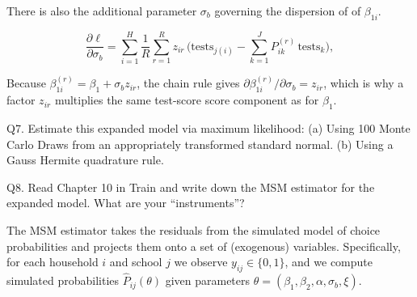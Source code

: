 \documentclass{article}
\begin{document}
There is also the additional parameter $\sigma_b$ governing the dispersion of of $\beta_{1i}$.

\[
\frac{\partial \ell}{\partial \sigma_b}
=\sum_{i=1}^H \frac{1}{R}\sum_{r=1}^R 
z_{ir}\,\Big( \text{tests}_{j(i)} - \sum_{k=1}^J P_{ik}^{(r)}\,\text{tests}_k \Big),
\]

Because $\beta_{1i}^{(r)} = \beta_1 + \sigma_b z_{ir}$, the chain rule gives 
$\partial \beta_{1i}^{(r)} / \partial \sigma_b = z_{ir}$, which is why a factor $z_{ir}$ multiplies the same test-score score component as for $\beta_1$.



\begin{tcolorbox}
Q7. Estimate this expanded model via maximum likelihood: (a) Using 100 Monte Carlo Draws from an appropriately transformed standard normal. (b) Using a Gauss Hermite quadrature rule.
\end{tcolorbox}

\begin{table}[H]
\centering
{}
\caption{Estimation results for logit models.}
\end{table}


\begin{tcolorbox}
Q8. Read Chapter 10 in Train and write down the MSM estimator for the expanded model. What are your ``instruments''?
\end{tcolorbox}

The MSM estimator takes the residuals from the simulated model of choice probabilities and projects them onto a set of (exogenous) variables. Specifically, for each household $i$ and school $j$ we observe $y_{ij}\in\{0,1\}$, and we compute simulated probabilities $\hat P_{ij}(\theta)$ given parameters $\theta=(\beta_1,\beta_2,\alpha,\sigma_b,\xi)$.  
\end{document}
